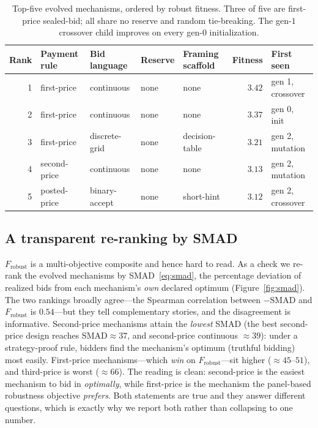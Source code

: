 \documentclass[12pt]{article}
\begin{document}
\begin{table}[t]
\centering
\caption{Top-five evolved mechanisms, ordered by robust fitness. Three of five are
first-price sealed-bid; all share no reserve and random tie-breaking. The gen-$1$
crossover child improves on every gen-$0$ initialization.}
\label{tab:ea}
\footnotesize
\setlength{\tabcolsep}{4.5pt}
\begin{tabular}{@{}rllllrl@{}}
\toprule
Rank & Payment rule & Bid language & Reserve & Framing scaffold & Fitness & First seen \\
\midrule
1 & first-price   & continuous     & none & none           & $3.42$ & gen 1, crossover \\
2 & first-price   & continuous     & none & none           & $3.37$ & gen 0, init      \\
3 & first-price   & discrete-grid  & none & decision-table & $3.21$ & gen 2, mutation  \\
4 & second-price  & continuous     & none & none           & $3.13$ & gen 2, mutation  \\
5 & posted-price  & binary-accept  & none & short-hint     & $3.12$ & gen 2, crossover \\
\bottomrule
\end{tabular}
\end{table}

\subsection{A transparent re-ranking by SMAD}

$F_{\mathrm{robust}}$ is a multi-objective composite and hence hard to read. As a
check we re-rank the evolved mechanisms by SMAD~\eqref{eq:smad}, the percentage
deviation of realized bids from each mechanism's \emph{own} declared optimum
(Figure~\ref{fig:smad}). The two rankings broadly agree---the Spearman correlation
between $-\mathrm{SMAD}$ and $F_{\mathrm{robust}}$ is $0.54$---but they tell
complementary stories, and the disagreement is informative. Second-price mechanisms
attain the \emph{lowest} SMAD (the best second-price design reaches
$\mathrm{SMAD}\approx37$, and second-price continuous $\approx39$): under a
strategy-proof rule, bidders find the mechanism's optimum (truthful bidding) most
easily. First-price mechanisms---which \emph{win} on $F_{\mathrm{robust}}$---sit
higher ($\approx45$--$51$), and third-price is worst ($\approx66$). The reading is
clean: second-price is the easiest mechanism to bid in \emph{optimally}, while
first-price is the mechanism the panel-based robustness objective \emph{prefers}.
Both statements are true and they answer different questions, which is exactly why
we report both rather than collapsing to one number.
\end{document}
